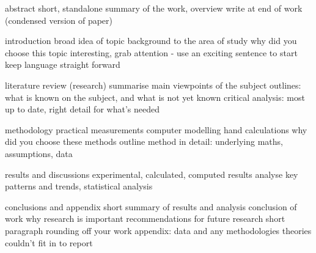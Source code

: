 \documentclass{report}
\begin{document}
abstract
short, standalone summary of the work, overview
write at end of work (condensed version of paper)


introduction
broad idea of topic
background to the area of study
why did you choose this topic
interesting, grab attention - use an exciting sentence to start
keep language straight forward


literature review (research)
summarise main viewpoints of the subject
outlines: what is known on the subject, and what is not yet known
critical analysis: most up to date, right detail for what's needed


methodology
practical measurements
computer modelling
hand calculations
why did you choose these methods
outline method in detail: underlying maths, assumptions, data


results and discussions
experimental, calculated, computed results
analyse key patterns and trends, statistical analysis


conclusions and appendix
short summary of results and analysis
conclusion of work
why research is important
recommendations for future research
short paragraph rounding off your work
appendix: data and any methodologies theories couldn't fit in to report
\end{document}
